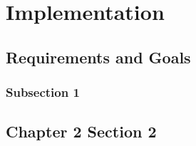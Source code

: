 \chapter{Implementation}
\section{Requirements and Goals}
\subsection{Subsection 1}
\section{Chapter 2 Section 2}
